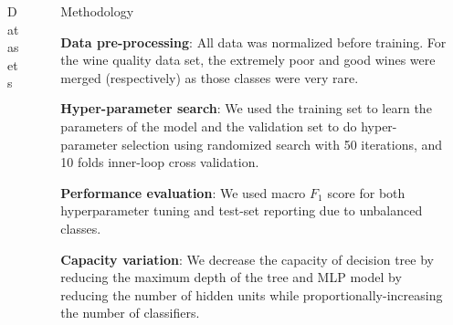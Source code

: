 \documentclass[final]{beamer}
\newlength{\sepwid}
\newlength{\onecolwid}
\newlength{\twocolwid}
\begin{document}
\begin{frame}[t]
\begin{columns}[t]
\begin{column}{\onecolwid}
\begin{block}{Datasets}
\end{block}


\end{column} %

\begin{column}{\sepwid}\end{column} %

\begin{column}{\twocolwid} %

\begin{columns}[t,totalwidth=\twocolwid] %

\begin{column}{\onecolwid}\vspace{-.6in} %


\begin{block}{Methodology}

\textbf{Data pre-processing}: All data was normalized before training. For the wine quality data set, the extremely poor and good wines were merged (respectively) as those classes were very rare. 

\textbf{Hyper-parameter search}: We used the training set to learn the parameters of the model and the validation set to do hyper-parameter selection using randomized search with 50 iterations, and 10 folds inner-loop cross validation. 

\textbf{Performance evaluation}: We used macro $F_1$ score for both hyperparameter tuning and test-set reporting due to unbalanced classes.

\textbf{Capacity variation}: We decrease the capacity of decision tree by reducing the maximum depth of the tree and MLP model by reducing the number of hidden units while proportionally-increasing the number of classifiers.

\end{block}


\end{column} %

\begin{column}{\onecolwid}\vspace{-.6in} %



\end{column}
\end{columns}
\end{column}
\end{columns}
\end{frame}
\end{document}
